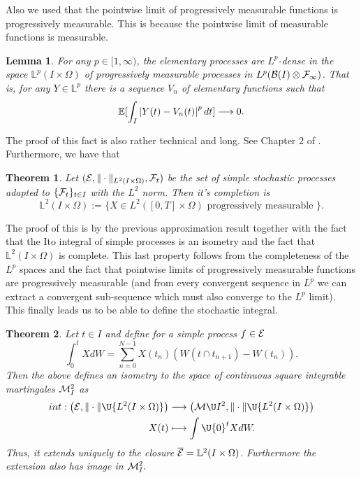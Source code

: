 \documentclass[12pt]{article}
\newtheorem{theorem}{Theorem}
\newtheorem{lemma}{Lemma}
\begin{document}
Also we used that the pointwise limit of progressively measurable functions is progressively measurable. This is because the pointwise limit of measurable functions is measurable.
\begin{lemma}
	For any $p \in[1, \infty)$, the elementary processes are $L^{p}$-dense in the space $\mathbb{L}^{p}(I\times\Omega)$ of progressively measurable processes in $L^p(\mathcal{B}(I)\otimes\mathcal{F}_\infty)$. That is, for any $Y \in \mathbb{L}^{p}$ there is a sequence $V_{n}$ of elementary functions such that
	$$
		\mathbb{E}[\int_{I}\left|Y(t)-V_{n}(t)\right|^{p} dt] \longrightarrow 0.
	$$
\end{lemma}
The proof of this fact is also rather technical and long. See Chapter $2$ of \cite{Lalley2013NOTESOT}. Furthermore, we have that
\begin{theorem}
	Let $(\mathcal{E},\|\cdot\|_{L^2(I\times\Omega)},\mathcal{F}_t)$ be the set of simple stochastic processes adapted to $\{\mathcal{F}_t\}_{t\in I}$ with the $L^2$ norm. Then it's completion is
	\begin{equation*}
		\mathbb{L}^2(I\times\Omega):=\{X\in L^2([0,T]\times\Omega)\text{ progressively measurable }\}.
	\end{equation*}
\end{theorem}
The proof of this is by the previous approximation result together with the fact that the Ito integral of simple processes is an isometry and the fact that $\mathbb{L}^2(I\times\Omega)$ is complete. This last property follows from the completeness of the $L^p$ spaces and the fact that pointwise limits of progressively measurable functions are progressively measurable (and from every convergent sequence in $L^p$ we can extract a convergent sub-sequence which must also converge to the $L^p$ limit).
This finally leads us to be able to define the stochastic integral.
\begin{theorem}
	Let $t\in I$ and define for a simple process $f\in\mathcal{E}$ $$\int_{0}^t X dW=\sum_{n=0}^{N-1} X(t_n)(W(t\cap t_{n+1})-W(t_n)).$$
	Then the above defines an isometry to the space of continuous square integrable martingales $\mathcal{M}_I^2$ as
	\begin{align*}
		int: \left(\mathcal{E},\|\cdot\|\U {L^2(I\times\Omega)}\right) & \longrightarrow  \left(\mathcal{M}\U I^2,\|\cdot\|\U {L^2(I\times\Omega)}\right) \\
		X(t)                                                           & \longmapsto \int\U {0}^t X dW
		.\end{align*}
	Thus, it extends uniquely to the closure $\overline{\mathcal{E}}=\mathbb{L}^2(I\times\Omega)$. Furthermore the extension also has image in $\mathcal{M}_I^2.$
\end{theorem}
\end{document}
